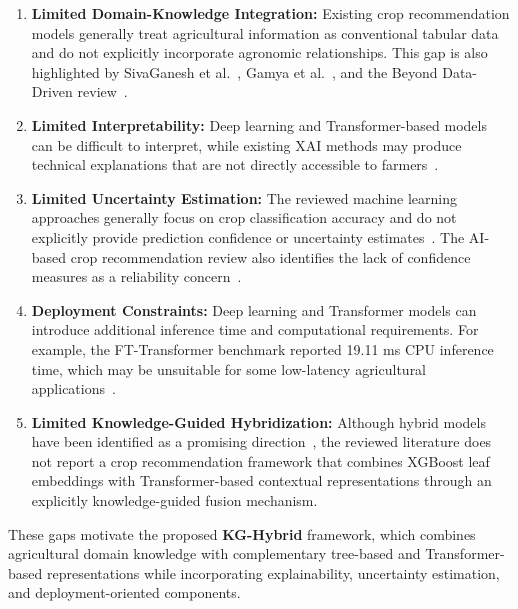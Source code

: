 \documentclass[journal]{IEEEtran}
\begin{document}
\begin{enumerate}
    \item \textbf{Limited Domain-Knowledge Integration:} Existing crop recommendation models generally treat agricultural information as conventional tabular data and do not explicitly incorporate agronomic relationships. This gap is also highlighted by SivaGanesh et al.~\cite{sivaganesh2026machine}, Gamya et al.~\cite{gamya2025comparative}, and the Beyond Data-Driven review~\cite{beyond2026data}.

    \item \textbf{Limited Interpretability:} Deep learning and Transformer-based models can be difficult to interpret, while existing XAI methods may produce technical explanations that are not directly accessible to farmers~\cite{xie2024recent,thilakarathne2025machine}.

    \item \textbf{Limited Uncertainty Estimation:} The reviewed machine learning approaches generally focus on crop classification accuracy and do not explicitly provide prediction confidence or uncertainty estimates~\cite{sivaganesh2026machine,gamya2025comparative,reddy2025comparative,xgboost2026comparative}. The AI-based crop recommendation review also identifies the lack of confidence measures as a reliability concern~\cite{ai2024comprehensive}.

    \item \textbf{Deployment Constraints:} Deep learning and Transformer models can introduce additional inference time and computational requirements. For example, the FT-Transformer benchmark reported 19.11 ms CPU inference time, which may be unsuitable for some low-latency agricultural applications~\cite{fttransformer2026benchmarking}.

    \item \textbf{Limited Knowledge-Guided Hybridization:} Although hybrid models have been identified as a promising direction~\cite{chettri2026deep}, the reviewed literature does not report a crop recommendation framework that combines XGBoost leaf embeddings with Transformer-based contextual representations through an explicitly knowledge-guided fusion mechanism.
\end{enumerate}

These gaps motivate the proposed \textbf{KG-Hybrid} framework, which combines agricultural domain knowledge with complementary tree-based and Transformer-based representations while incorporating explainability, uncertainty estimation, and deployment-oriented components.
\end{document}
